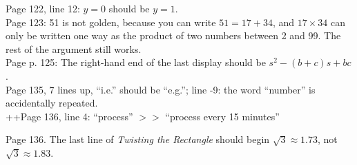 \documentclass[11pt]{article}
\begin{document}
Page 122, line 12: $y=0$ should be $y=1$.\\

Page 123: 51 is not golden, because you can write $51=17+34$, and $17 \times 34$ can only be written one
way as the product of two numbers between 2 and 99.  The rest of the argument still works.\\

Page p. 125: The right-hand end of the last display should be $s^2-(b+c)s+bc$.\\

Page 135, 7 lines up,  ``i.e.'' should be ``e.g.'';
line -9: the word ``number'' is accidentally repeated.\\

++Page 136, line 4: ``process'' $>>$ ``process every 15 minutes''

Page 136. The last line of {\em Twisting the Rectangle} should begin $\sqrt{3}\approx 1.73$, not
$\sqrt{3}\approx 1.83$.
\end{document}
